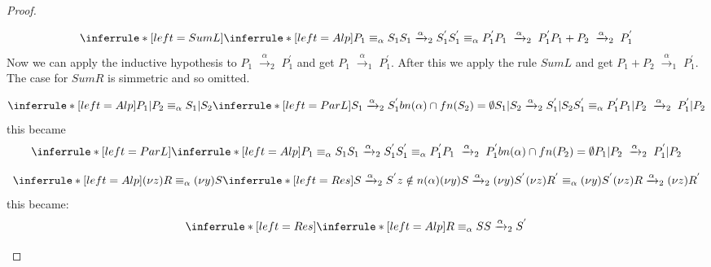 \begin{theorem}
\begin{proof}
\begin{description}
\begin{description}
\[	      \inferrule* [left=SumL]{
		\inferrule* [left=Alp]{
		    P_{1}\equiv_{\alpha}S_{1}
		  \\
		    S_{1}\xrightarrow{\alpha}_{2}S_{1}^{'}
		  \\
		    S_{1}^{'}\equiv_{\alpha} P_{1}^{'}
		}{
		  P_{1}\; \xrightarrow{\alpha}_{2}\; P_{1}^{'}
		}
	      }{
		P_{1}+P_{2}\; \xrightarrow{\alpha}_{2}\; P_{1}^{'}
	      }
	    \]
	    Now we can apply the inductive hypothesis to $P_{1}\; \xrightarrow{\alpha}_{2}\; P_{1}^{'}$ and get $P_{1}\; \xrightarrow{\alpha}_{1}\; P_{1}^{'}$. After this we apply the rule $SumL$ and get $P_{1}+P_{2}\; \xrightarrow{\alpha}_{1}\; P_{1}^{'}$. The case for $SumR$ is simmetric and so omitted.
	  \item[ParL]
	    \[
	      \inferrule* [left=Alp]{
		  P_{1}|P_{2}\equiv_{\alpha}S_{1}|S_{2}
		\\
		  \inferrule* [left=ParL]{
		      S_{1}\xrightarrow{\alpha}_{2}S_{1}^{'}
		    \\
		      bn(\alpha)\cap fn(S_{2})=\emptyset
		  }{
		    S_{1}|S_{2}\xrightarrow{\alpha}_{2}S_{1}^{'}|S_{2}
		  }
		\\
		  S_{1}^{'}\equiv_{\alpha} P_{1}^{'}
	      }{
		P_{1}|P_{2}\; \xrightarrow{\alpha}_{2}\; P_{1}^{'}|P_{2}
	      }
	    \]
	    this became
	    \[
	      \inferrule* [left=ParL]{
		  \inferrule* [left=Alp]{
		      P_{1}\equiv_{\alpha}S_{1}
		    \\
		      S_{1}\xrightarrow{\alpha}_{2}S_{1}^{'}
		    \\
		      S_{1}^{'}\equiv_{\alpha} P_{1}^{'}
		  }{
		    P_{1}\; \xrightarrow{\alpha}_{2}\; P_{1}^{'}
		  }
		\\
		   bn(\alpha)\cap fn(P_{2})=\emptyset
	      }{
		P_{1}|P_{2}\; \xrightarrow{\alpha}_{2}\; P_{1}^{'}|P_{2}
	      }
	    \]
	  \item[Res]
	    \[
	      \inferrule* [left=Alp]{
		  (\nu z)R\equiv_{\alpha}(\nu y)S
		\\
		  \inferrule* [left=Res]{
		      S\xrightarrow{\alpha}_{2}S^{'}
		    \\
		      z\notin n(\alpha)
		  }{
		    (\nu y) S \xrightarrow{\alpha}_{2} (\nu y) S^{'}
		  }
		\\
		  (\nu z)R^{'}\equiv_{\alpha} (\nu y) S^{'}
	      }{
		(\nu z) R \xrightarrow{\alpha}_{2} (\nu z) R^{'}
	      }
	    \]
	    this became:
	    \[
	      \inferrule* [left=Res]{
		  \inferrule* [left=Alp]{
		      R\equiv_{\alpha}S
		    \\
		      S\xrightarrow{\alpha}_{2}S^{'}
		    \\
}}\]
\end{description}
\end{description}
\end{proof}
\end{theorem}
